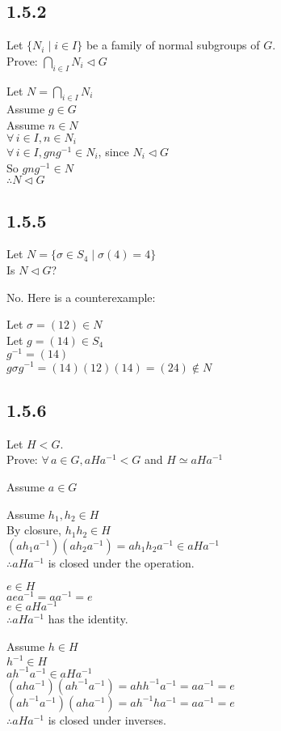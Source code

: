\documentclass[letterpaper,12pt,fleqn]{article}
\newcommand{\n}{\mathrel{\triangleleft}}
\renewcommand{\o}{\sigma}
\begin{document}
\subsection*{1.5.2}

Let $\{N_i\mid i\in I\}$ be a family of normal subgroups of $G$. \\
Prove: $\bigcap_{i\in I}N_i\n G$

Let $N=\bigcap_{i\in I}N_i$ \\
Assume $g\in G$ \\
Assume $n\in N$ \\
$\forall\,i\in I,n\in N_i$ \\
$\forall\,i\in I,gng^{-1}\in N_i$, since $N_i\n G$ \\
So $gng^{-1}\in N$ \\
$\therefore N\n G$

\subsection*{1.5.5}

Let $N=\{\o\in S_4\mid\o(4)=4\}$ \\
Is $N\n G$?

No.  Here is a counterexample:

Let $\o=(12)\in N$ \\
Let $g=(14)\in S_4$ \\
$g^{-1}=(14)$ \\
$g\o g^{-1}=(14)(12)(14)=(24)\notin N$

\subsection*{1.5.6}

Let $H<G$. \\
Prove: $\forall\,a\in G,aHa^{-1}<G$ and $H\simeq aHa^{-1}$

Assume $a\in G$

Assume $h_1,h_2\in H$ \\
By closure, $h_1h_2\in H$ \\
$(ah_1a^{-1})(ah_2a^{-1})=ah_1h_2a^{-1}\in aHa^{-1}$ \\
$\therefore aHa^{-1}$ is closed under the operation.

$e\in H$ \\
$aea^{-1}=aa^{-1}=e$ \\
$e\in aHa^{-1}$ \\
$\therefore aHa^{-1}$ has the identity.

Assume $h\in H$ \\
$h^{-1}\in H$ \\
$ah^{-1}a^{-1}\in aHa^{-1}$ \\
$(aha^{-1})(ah^{-1}a^{-1})=ahh^{-1}a^{-1}=aa^{-1}=e$ \\
$(ah^{-1}a^{-1})(aha^{-1})=ah^{-1}ha^{-1}=aa^{-1}=e$ \\
$\therefore aHa^{-1}$ is closed under inverses.
\end{document}
